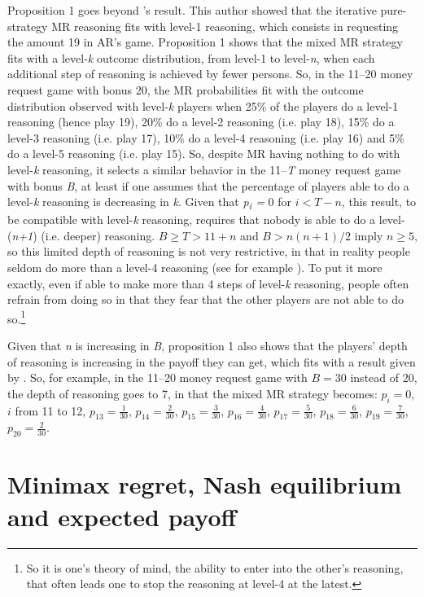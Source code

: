 \begin{Article}
\begin{refsection}[Umbhauer]
Proposition 1 goes beyond \textcite{garciapola2020}'s result. This author showed that the iterative pure-strategy MR reasoning fits
with level-1 reasoning, which consists in requesting the amount 19 in
AR's game. Proposition 1 shows that the mixed MR strategy fits with a
level-\emph{k} outcome distribution, from level-1 to level-\emph{n},
when each additional step of reasoning is achieved by fewer persons. So,
in the 11--20 money request game with bonus 20, the MR probabilities fit
with the outcome distribution observed with level-\emph{k} players when
25\% of the players do a level-1 reasoning (hence play 19), 20\% do a
level-2 reasoning (i.e. play 18), 15\% do a level-3 reasoning (i.e. play
17), 10\% do a level-4 reasoning (i.e. play 16) and 5\% do a level-5
reasoning (i.e. play 15). So, despite MR having nothing to do with
level-\emph{k} reasoning, it selects a similar behavior in the
11--\emph{T} money request game with bonus \emph{B}, at least if one
assumes that the percentage of players able to do a level-\emph{k}
reasoning is decreasing in \emph{k}. Given that \emph{p\textsubscript{i}
=} 0 for \(i < T - n\), this result, to be compatible with
level-\emph{k} reasoning, requires that nobody is able to do a
level-(\emph{n+1}) (i.e. deeper) reasoning. \(B \geq T > 11 + n\) and
\(B > n(n + 1)/2\) imply \(n \geq 5\), so this limited depth of
reasoning is not very restrictive, in that in reality people seldom do
more than a level-4 reasoning (see for example \textcite{crawford2013}). To
put it more exactly, even if able to make more than 4 steps of
level-\emph{k} reasoning, people often refrain from doing so in that
they fear that the other players are not able to do so.\footnote{So it
  is one's theory of mind, the ability to enter into the other's
  reasoning, that often leads one to stop the reasoning at level-4 at
  the latest.}

Given that \emph{n} is increasing in \emph{B}, proposition 1 also shows
that the players' depth of reasoning is increasing in the payoff they
can get, which fits with a result given by \textcite{alaoui2016}.
So, for example, in the 11--20 money request game with \(B = 30\)
instead of 20, the depth of reasoning goes to 7, in that the mixed MR
strategy becomes: $p_{i} = 0$, $i$ from 11 to 12, $p_{13} = \frac{1}{30}$, $p_{14} = \frac{2}{30}$, $p_{15} = \frac{3}{30}$, $p_{16} = \frac{4}{30}$, $p_{17} = \frac{5}{30}$, $p_{18} = \frac{6}{30}$, $p_{19} = \frac{7}{30}$, $p_{20} = \frac{2}{30}$.


\section{Minimax regret, Nash equilibrium and expected payoff}
\label{section:Minimax regret, Nash equil}


\end{refsection}
\end{Article}
